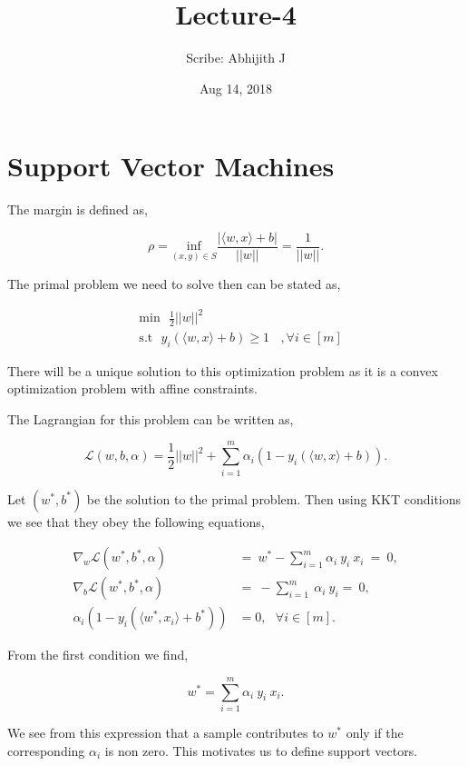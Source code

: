\documentclass[a4paper,english,12pt]{article}
\title{Lecture-4}
\date{Aug 14, 2018}
\author{Scribe: Abhijith J}
\begin{document}
\maketitle
\section{Support Vector Machines}
The margin is defined as,

\begin{equation}
\rho = \underset{(x,y) \in S} {\mathrm{inf}} \frac{|\langle w,x \rangle + b|}{||w||} = \frac{1}{||w||}.
\end{equation}

The primal problem we need to solve then can be stated as, 

\begin{align}
&\text{min} ~~~\frac{1}{2} || w||^2\\
&\text{s.t} ~~~ y_i ( \langle w,x \rangle + b) \geq 1 ~~~~, \forall i \in [m]
\end{align}

There will be a unique solution to this optimization problem as it is a convex optimization problem with affine constraints.

The Lagrangian for this problem can be written as,

\begin{equation}
 \mathcal{L}(w,b, \alpha) = \frac{1}{2} || w||^2 +  \sum_{i = 1}^m \alpha_i (1 -  y_i ( \langle w,x \rangle + b)).
\end{equation}

Let $(w^*, b^*)$ be the solution to the primal problem. Then using KKT conditions we see that they obey the following equations,

\begin{align*}
\nabla_w \mathcal{L}(w^*, b^*, \alpha)~ &= ~ w^* -  \sum_{i =1} ^m \alpha_i~ y_i ~x_i ~=~ 0, \\
\nabla_b \mathcal{L}(w^*, b^*, \alpha)~ & = ~ - \sum_{i= 1}^m ~ \alpha_i~ y_i =~ 0, \\
\alpha_i(1- y_i(\langle w^*,x_i \rangle + b^* ))& = 0 , ~~~\forall i \in [m].
\end{align*} 

From the first condition we find,

\begin{equation}
w^* =  \sum_{i =1} ^m \alpha_i~ y_i ~x_i.
\end{equation}

We see from this expression that a sample contributes to $w^*$ only if the corresponding $\alpha_i$ is non zero. This motivates us to define support vectors.
\end{document}
